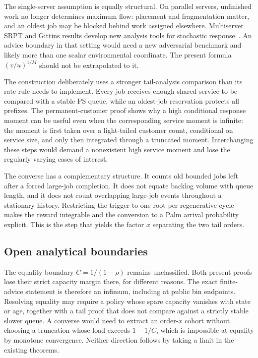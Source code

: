 The single-server assumption is equally structural.  On parallel servers, unfinished work no longer determines maximum flow: placement and fragmentation matter, and an oldest job may be blocked behind work assigned elsewhere.  Multiserver SRPT and Gittins results develop new analysis tools for stochastic response~\cite{grosof2018,scully2020gittins,hong2024}.  An advice boundary in that setting would need a new adversarial benchmark and likely more than one scalar environmental coordinate.  The present formula $(v/u)^{1/M}$ should not be extrapolated to it.

The construction deliberately uses a stronger tail-analysis comparison than its rate rule needs to implement. Every job receives enough shared service to be compared with a stable PS queue, while an oldest-job reservation protects all prefixes. The permanent-customer proof shows why a high conditional response moment can be useful even when the corresponding service moment is infinite: the moment is first taken over a light-tailed customer count, conditional on service size, and only then integrated through a truncated moment. Interchanging these steps would demand a nonexistent high service moment and lose the regularly varying cases of interest.

The converse has a complementary structure. It counts old bounded jobs left after a forced large-job completion. It does not equate backlog volume with queue length, and it does not count overlapping large-job events throughout a stationary history. Restricting the trigger to one root per regenerative cycle makes the reward integrable and the conversion to a Palm arrival probability explicit. This is the step that yields the factor $x$ separating the two tail orders.

\subsection{Open analytical boundaries}
The equality boundary $C=1/(1-\rho)$ remains unclassified. Both present proofs lose their strict capacity margin there, for different reasons. The exact finite-advice statement is therefore an infimum, including at public bin endpoints. Resolving equality may require a policy whose spare capacity vanishes with state or age, together with a tail proof that does not compare against a strictly stable slower queue. A converse would need to extract an order-$x$ cohort without choosing a truncation whose load exceeds $1-1/C$, which is impossible at equality by monotone convergence. Neither direction follows by taking a limit in the existing theorems.

